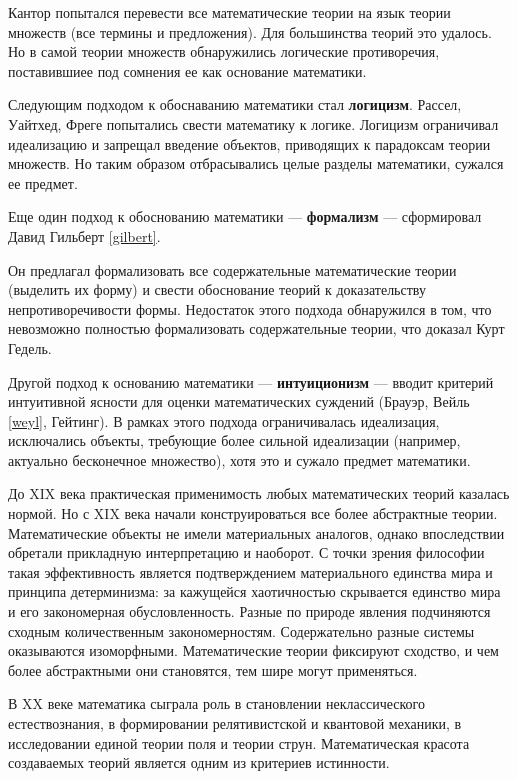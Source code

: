 \documentclass[a4paper,14pt]{extreport}
\begin{document}
Кантор попытался перевести все математические теории на язык теории множеств (все термины и предложения). Для большинства теорий это удалось. Но в самой теории множеств обнаружились логические противоречия, поставившиее под сомнения ее как основание математики.  
\cite{mironov}

Следующим подходом к обоснаванию математики стал \textbf{логицизм}. 
Рассел, Уайтхед, Фреге попытались свести математику к логике.
Логицизм ограничивал идеализацию и запрещал введение объектов, приводящих к парадоксам теории множеств. Но таким образом отбрасывались целые разделы математики, сужался ее предмет. \cite{mironov}

Еще один подход к обоснованию математики --- \textbf{формализм} --- сформировал Давид Гильберт \ref{gilbert}.

Он предлагал формализовать все содержательные математические теории (выделить их форму) и свести обоснование теорий к доказательству непротиворечивости формы. Недостаток этого подхода обнаружился в том, что невозможно полностью формализовать содержательные теории, что доказал Курт Гедель.
\cite{mironov}

Другой подход к основанию математики --- \textbf{интуиционизм} --- вводит критерий интуитивной ясности для оценки математических суждений (Брауэр, Вейль \ref{weyl}, Гейтинг).
В рамках этого подхода ограничивалась идеализация, исключались объекты, требующие более сильной идеализации (например, актуально бесконечное множество), хотя это и сужало предмет математики. \cite{mironov}

До XIX века практическая применимость любых математических теорий казалась нормой. Но с XIX века начали конструироваться все более абстрактные теории. Математические объекты не имели материальных аналогов, однако впоследствии обретали прикладную интерпретацию и наоборот.
С точки зрения философии такая эффективность является подтверждением материального единства мира и принципа детерминизма: за кажущейся хаотичностью скрывается единство мира и его закономерная обусловленность. Разные по природе явления подчиняются сходным количественным закономерностям.
Содержательно разные системы оказываются изоморфными. 
Математические теории фиксируют сходство, и чем более абстрактными они становятся, тем шире могут применяться. 
\cite{mironov}

В XX веке математика 
сыграла роль в становлении неклассического естествознания, в формировании релятивистской и квантовой механики, в исследовании единой теории поля и теории струн.
Математическая красота создаваемых теорий является одним из критериев истинности.
\end{document}
